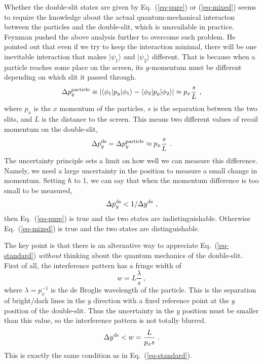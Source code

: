 \documentclass[aps,showpacs,twocolumn,floats,prd,superscriptaddress,nofootinbib]{revtex4-1}
\begin{document}
Whether the double-slit states are given by Eq.~(\ref{eq-pure}) or (\ref{eq-mixed}) seems to require the knowledge about the actual quantum-mechanical interacton between the particles and the double-slit, which is unavailable in practice.
Feynman pushed the above analysis further to overcome such problem.
He pointed out that even if we try to keep the interaction minimal, there will be one inevitable interaction that makes $|\psi_1\rangle$ and $|\psi_2\rangle$ different.
That is because when a particle reaches some place on the screen, its $y$-momentum must be different depending on which slit it passed through.
\begin{equation}
\Delta p_y^{\rm particle} \equiv 
|\langle\phi_1|p_y|\phi_1\rangle - \langle\phi_2|p_y|\phi_2\rangle| 
\approx p_x \frac{s}{L}~,
\end{equation}
where $p_x$ is the $x$ momentum of the particles, $s$ is the separation between the two slits, and $L$ is the distance to the screen. 
This means two different values of recoil momentum on the double-slit,
\begin{equation}
\Delta p_y^{\rm ds} = \Delta p_y^{\rm particle} \approx p_x \frac{s}{L}~.
\label{eq-dpds}
\end{equation}
The uncertainty principle sets a limit on how well we can measure this difference. Namely, we need a large uncertainty in the position to measure a small change in momentum. Setting $\hbar$ to 1, we can say that when the momentum difference is too small to be measured,
\begin{equation}
\Delta p_y^{\rm ds} < 1/\Delta y^{\rm ds}~,
\label{eq-standard}
\end{equation} 
then Eq.~(\ref{eq-pure}) is true and the two states are indistinguishable. 
Otherwise Eq.~(\ref{eq-mixed}) is true and the two states are distinguishable.

The key point is that there is an alternative way to appreciate Eq.~(\ref{eq-standard}) {\it without} thinking about the quantum mechanics of the double-slit. 
First of all, the interference pattern has a fringe width of  
\begin{equation}
w = L\frac{\lambda}{s}~,
\end{equation}
where $\lambda = p_x^{-1}$ is the de Broglie wavelength of the particle. This is the separation of bright/dark lines in the $y$ direction with a fixed reference point at the $y$ position of the double-slit. Thus the uncertainty in the $y$ position must be smaller than this value, so the interference pattern is not totally blurred.
\begin{equation}
\Delta y^{\rm ds} < w = \frac{L}{p_xs}~.
\label{eq-stdcls}
\end{equation}
This is exactly the same condition as in Eq.~(\ref{eq-standard}).
\end{document}
